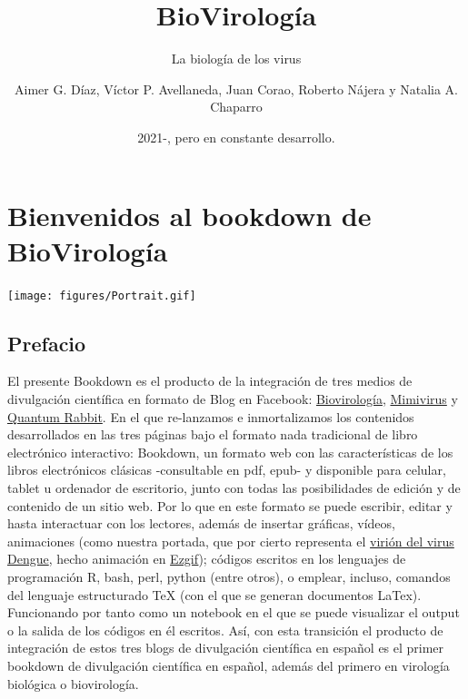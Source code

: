 \documentclass[
  12pt, krantz2,
  spanish,
]{krantz}
\title{BioVirología}
\subtitle{La biología de los virus}
\author{Aimer G. Díaz, Víctor P. Avellaneda, Juan Corao, Roberto Nájera y Natalia A. Chaparro}
\date{2021-, pero en constante desarrollo.}
\begin{document}
\maketitle

{
\setcounter{tocdepth}{2}
\tableofcontents
}
\hypertarget{bienvenidos-al-bookdown-de-biovirologuxeda}{%
\section*{Bienvenidos al bookdown de BioVirología}\label{bienvenidos-al-bookdown-de-biovirologuxeda}}

\texttt{[image: figures/Portrait.gif]}

\hypertarget{prefacio}{%
\subsection*{Prefacio}\label{prefacio}}

El presente Bookdown es el producto de la integración de tres medios de divulgación científica en formato de Blog en Facebook: \href{https://www.facebook.com/BioViral/}{Biovirología}, \href{https://www.facebook.com/Mimivirus-100736401569015}{Mimivirus} y \href{https://www.facebook.com/Medicina88}{Quantum Rabbit}. En el que re-lanzamos e inmortalizamos los contenidos desarrollados en las tres páginas bajo el formato nada tradicional de libro electrónico interactivo: Bookdown, un formato web con las características de los libros electrónicos clásicas -consultable en pdf, epub- y disponible para celular, tablet u ordenador de escritorio, junto con todas las posibilidades de edición y de contenido de un sitio web. Por lo que en este formato se puede escribir, editar y hasta interactuar con los lectores, además de insertar gráficas, vídeos, animaciones (como nuestra portada, que por cierto representa el \href{https://www.ebi.ac.uk/pdbe/entry/search/index/?searchParams=\%7B\%22q_scop_family\%22:\%5B\%7B\%22value\%22:\%22Virus\%20envelope\%20proteins\%22,\%22condition1\%22:\%22AND\%22,\%22condition2\%22:\%22Contains\%22\%7D\%5D,\%22resultState\%22:\%7B\%22tabIndex\%22:0,\%22paginationIndex\%22:1,\%22perPage\%22:\%2210\%22,\%22sortBy\%22:\%22Sort\%20by\%22\%7D\%7D}{virión del virus Dengue}, hecho animación en \href{https://ezgif.com/video-to-gif}{Ezgif}); códigos escritos en los lenguajes de programación R, bash, perl, python (entre otros), o emplear, incluso, comandos del lenguaje estructurado TeX (con el que se generan documentos LaTex). Funcionando por tanto como un notebook en el que se puede visualizar el output o la salida de los códigos en él escritos. Así, con esta transición el producto de integración de estos tres blogs de divulgación científica en español es el primer bookdown de divulgación científica en español, además del primero en virología biológica o biovirología.
\end{document}
